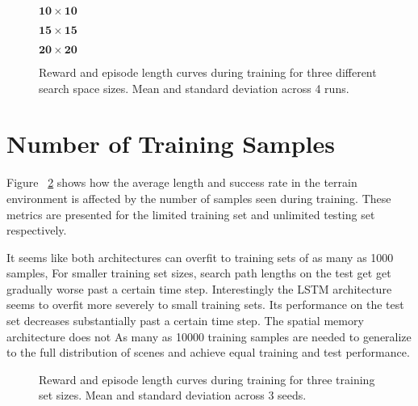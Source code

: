 \begin{figure}
    \centering
    \(\mathbf{10 \times 10}\)
    
    \(\mathbf{15 \times 15}\)
    
    \(\mathbf{20 \times 20}\)
    
    \label{fig:shape}
    \caption[Search space size learning curve.]{Reward and episode length curves during training for three different search space sizes. Mean and standard deviation across 4 runs.}
\end{figure}

\section{Number of Training Samples}

Figure ~\ref{fig:sample} shows how the average length and success rate in the terrain environment is affected by the number of samples seen during training.
These metrics are presented for the limited training set and unlimited testing set respectively.

It seems like both architectures can overfit to training sets of as many as 1000 samples,
For smaller training set sizes, search path lengths on the test get get gradually worse past a certain time step.
Interestingly the LSTM architecture seems to overfit more severely to small training sets.
Its performance on the test set decreases substantially past a certain time step.
The spatial memory architecture does not 
As many as 10000 training samples are needed to generalize to the full distribution of scenes and achieve equal training and test performance. 

\begin{figure}
    \centering
    
    
    
    
    \label{fig:sample}
    \caption[Generalization results.]{Reward and episode length curves during training for three training set sizes. Mean and standard deviation across 3 seeds.}
\end{figure}
